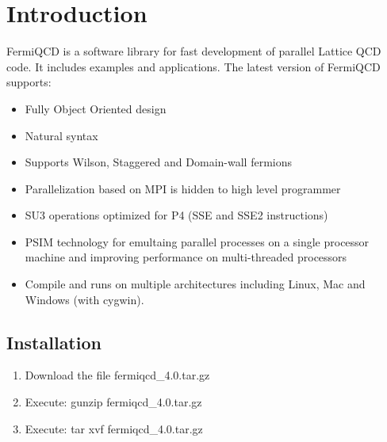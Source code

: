 






\section{Introduction}

FermiQCD is a software library for fast development of parallel Lattice QCD
code. It includes examples and applications. The latest version of FermiQCD
supports:

\begin{itemize}
\item  Fully Object Oriented design

\item  Natural syntax

\item  Supports Wilson, Staggered and Domain-wall fermions

\item  Parallelization based on MPI is hidden to high level programmer

\item  SU3 operations optimized for P4 (SSE and SSE2 instructions)

\item  PSIM technology for emultaing parallel processes on a single
processor machine and improving performance on multi-threaded processors

\item  Compile and runs on multiple architectures including Linux, Mac and
Windows (with cygwin).
\end{itemize}

\subsection{Installation}

\begin{enumerate}
\item  Download the file fermiqcd\_4.0.tar.gz

\item  Execute: gunzip fermiqcd\_4.0.tar.gz

\item  Execute: tar xvf fermiqcd\_4.0.tar.gz
\end{enumerate}

